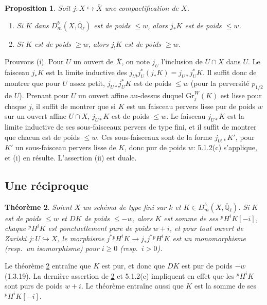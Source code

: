 \documentclass[12pt,a4paper]{article}
\theoremstyle{plain}
\newtheorem{theorem}{Th\'{e}or\`{e}me}[section]
\newtheorem{proposition}[theorem]{Proposition}
\theoremstyle{definition}
\newcommand{\into}{\hookrightarrow}
\begin{document}
\begin{proposition}\label{prop:5.1.4}
Soit $j: X \into \overline{X}$ une compactification de $X$.
\begin{enumerate}
\item[(i)] Si $K$ dans $D_{m}^{b}(X, \overline{\mathbb{Q}}_{\ell})$ est de poids $\leq w$, alors $j_{*}K$ est de poids $\leq w$.
\item[(ii)] Si $K$ est de poids $\geq w$, alors $j_{!}K$ est de poids $\geq w$.
\end{enumerate}
\end{proposition}

Prouvons (i). Pour $U$ un ouvert de $\overline{X}$, on note $j_{U}$ l'inclusion de $U \cap X$ dans $U$. Le faisceau $j_{*}K$ est la limite inductive des $j_{U!}j_{U}^{*}(j_{*}K) = j_{U*}j_{U}^{*}K$. Il suffit donc de montrer que pour $U$ assez petit, $j_{U*}j_{U}^{*}K$ est de poids $\leq w$ (pour la perversit\'{e} $p_{1/2}$ de $U$). Prenant pour $U$ un ouvert affine au-dessus duquel $\mathrm{Gr}_{j}^{W}(K)$ est lisse pour chaque $j$, il suffit de montrer que si $K$ est un faisceau pervers lisse pur de poids $w$ sur un ouvert affine $U \cap X$, $j_{U*}K$ est de poids $\leq w$. Le faisceau $j_{U*}K$ est la limite inductive de ses sous-faisceaux pervers de type fini, et il suffit de montrer que chacun est de poids $\leq w$. Ces sous-faisceaux sont de la forme $j_{U!*}K'$, pour $K'$ un sous-faisceau pervers lisse de $K$, donc pur de poids $w$: 5.1.2(c) s'applique, et (i) en r\'{e}sulte. L'assertion (ii) est duale.

\subsection{Une r\'{e}ciproque}

\begin{theorem}\label{thm:5.2.1}
Soient $X$ un sch\'{e}ma de type fini sur $k$ et $K \in D_{m}^{b}(X, \overline{\mathbb{Q}}_{\ell})$. Si $K$ est de poids $\leq w$ et $DK$ de poids $\leq -w$, alors $K$ est somme de ses ${}^{p}H^{i}K[-i]$, chaque ${}^{p}H^{i}K$ est ponctuellement pure de poids $w+i$, et pour tout ouvert de Zariski $j: U \into X$, le morphisme $j^{*}{}^{p}H^{i}K \longrightarrow j_{*}j^{*}{}^{p}H^{i}K$ est un monomorphisme (resp.\ un isomorphisme) pour $i \geq 0$ (resp.\ $i > 0$).
\end{theorem}

Le th\'{e}or\`{e}me \ref{thm:5.2.1} entra\^{i}ne que $K$ est pur, et donc que $DK$ est pur de poids $-w$ (1.3.19). La derni\`{e}re assertion de \ref{thm:5.2.1} et 5.1.2(c) impliquent en effet que les ${}^{p}H^{i}K$ sont purs de poids $w+i$. Le th\'{e}or\`{e}me entra\^{i}ne aussi que $K$ est la somme de ses ${}^{p}H^{i}K[-i]$.
\end{document}
